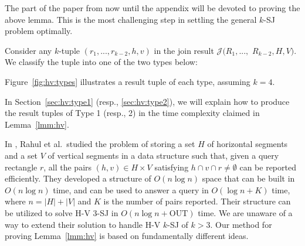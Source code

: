 \documentclass[sigconf]{acmart}
\def\vgap{\vspace{1mm}}
\def\extraspacing{\vspace{2mm} \noindent}
\def\J{\mathcal{J}}
\def\out{\mathrm{OUT}}
\begin{document}
The part of the paper from now until the appendix will be devoted to proving the above lemma. This is the most challenging step in settling the general $k$-SJ problem optimally.

\vgap



Consider any $k$-tuple $(r_1, ..., r_{k-2}, h, v)$ in the join result $\J(R_1, ...,$ $R_{k-2}, H, V)$. We classify the tuple into one of the two types below:

Figure~\ref{fig:hv:types} illustrates a result tuple of each type, assuming $k = 4$.

\vgap 

In Section~\ref{sec:hv:type1} (resp., \ref{sec:hv:type2}), we will explain how to produce the result tuples of Type 1 (resp., 2) in the time complexity claimed in Lemma~\ref{lmm:hv}.

\extraspacing {\bf Remark.} In \cite{rdr+11}, Rahul et al.\ studied the problem of storing a set $H$ of horizontal segments and a set $V$ of vertical segments in a data structure such that, given a query rectangle $r$, all the pairs $(h, v) \in H \times V$ satisfying $h \cap v \cap r \ne \emptyset$ can be reported efficiently. They developed a structure of $O(n \log n)$ space that can be built in $O(n \log n)$ time, and can be used to answer a query in $O(\log n + K)$ time, where $n = |H| + |V|$ and $K$ is the number of pairs reported. Their structure can be utilized to solve H-V 3-SJ in $O(n \log n + \out)$ time. We are unaware of a way to extend their solution to handle H-V $k$-SJ of $k > 3$. Our method for proving Lemma~\ref{lmm:hv} is based on fundamentally different ideas. 

\end{document}
